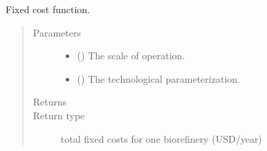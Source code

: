 \documentclass[letterpaper,10pt,english]{sphinxmanual}
\begin{document}
\begin{fulllineitems}
\label{\detokenize{doc-src/technology:technology.biorefinery_v1.fixed_cost}}
Fixed cost function.
\begin{quote}\begin{description}
\item[{Parameters}] \leavevmode\begin{itemize}
\item {} 
 (\sphinxstyleliteralemphasis{\sphinxupquote{ {[}}}\sphinxstyleliteralemphasis{\sphinxupquote{{]}}}) \textendash{} The scale of operation.

\item {} 
 () \textendash{} The technological parameterization.

\end{itemize}

\item[{Returns}] \leavevmode


\item[{Return type}] \leavevmode
total fixed costs for one biorefinery (USD/year)

\end{description}\end{quote}

\end{fulllineitems}

\end{document}
